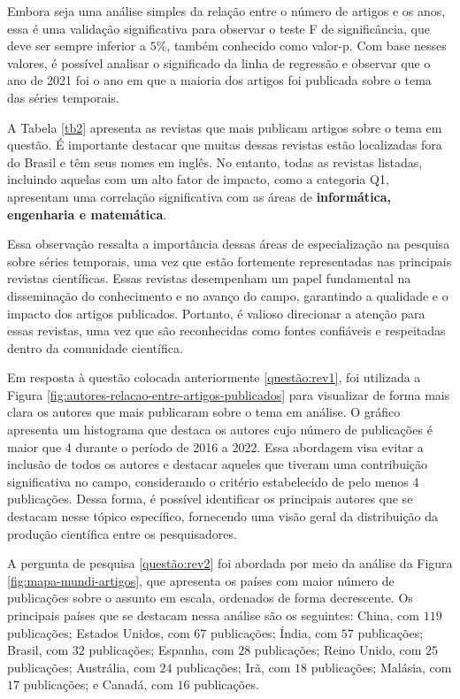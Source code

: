 Embora seja uma análise simples da relação entre o número de artigos e os anos, essa é uma validação significativa para observar o teste F de significância, que deve ser sempre inferior a $5\%$, também conhecido como valor-p. Com base nesses valores, é possível analisar o significado da linha de regressão e observar que o ano de 2021 foi o ano em que a maioria dos artigos foi publicada sobre o tema das séries temporais.



A Tabela \ref{tb2} apresenta as revistas que mais publicam artigos sobre o tema em questão. É importante destacar que muitas dessas revistas estão localizadas fora do Brasil e têm seus nomes em inglês. No entanto, todas as revistas listadas, incluindo aquelas com um alto fator de impacto, como a categoria Q1, apresentam uma correlação significativa com as áreas de \textbf{informática, engenharia e matemática}.

Essa observação ressalta a importância dessas áreas de especialização na pesquisa sobre séries temporais, uma vez que estão fortemente representadas nas principais revistas científicas. Essas revistas desempenham um papel fundamental na disseminação do conhecimento e no avanço do campo, garantindo a qualidade e o impacto dos artigos publicados. Portanto, é valioso direcionar a atenção para essas revistas, uma vez que são reconhecidas como fontes confiáveis e respeitadas dentro da comunidade científica.






Em resposta à questão colocada anteriormente \eqref{questão:rev1}, foi utilizada a Figura \ref{fig:autores-relacao-entre-artigos-publicados} para visualizar de forma mais clara os autores que mais publicaram sobre o tema em análise. O gráfico apresenta um histograma que destaca os autores cujo número de publicações é maior que 4 durante o período de 2016 a 2022. Essa abordagem visa evitar a inclusão de todos os autores e destacar aqueles que tiveram uma contribuição significativa no campo, considerando o critério estabelecido de pelo menos 4 publicações. Dessa forma, é possível identificar os principais autores que se destacam nesse tópico específico, fornecendo uma visão geral da distribuição da produção científica entre os pesquisadores.




A pergunta de pesquisa \eqref{questão:rev2} foi abordada por meio da análise da Figura \ref{fig:mapa-mundi-artigos}, que apresenta os países com maior número de publicações sobre o assunto em escala, ordenados de forma decrescente. Os principais países que se destacam nessa análise são os seguintes: China, com $119$ publicações; Estados Unidos, com $67$ publicações; Índia, com $57$ publicações; Brasil, com $32$ publicações; Espanha, com $28$ publicações; Reino Unido, com $25$ publicações; Austrália, com $24$ publicações; Irã, com $18$ publicações; Malásia, com $17$ publicações; e Canadá, com $16$ publicações.

